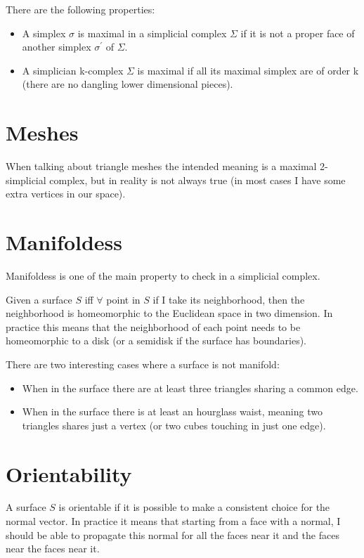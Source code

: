 There are the following properties:
\begin{itemize}
    \item A simplex $\sigma$ is maximal in a simplicial complex $\Sigma$ if it is not a proper face of another simplex $\sigma^{'}$ of $\Sigma$.
    \item A simplician k-complex $\Sigma$ is maximal if all its maximal simplex are of order k (there are no dangling lower dimensional pieces).
\end{itemize}

\section{Meshes}
When talking about triangle meshes the intended meaning is a maximal 2-simplicial complex, but in reality is not always true (in most cases I have some extra vertices in our space).

\section{Manifoldess}
Manifoldess is one of the main property to check in a simplicial complex.\par
Given a surface $S$ iff $\forall$ point in $S$ if I take its neighborhood, then the neighborhood is homeomorphic to the Euclidean space in two dimension. In practice this means that the neighborhood of each point needs to be homeomorphic to a disk (or a semidisk if the surface has boundaries).\par

There are two interesting cases where a surface is not manifold:
\begin{itemize}
    \item When in the surface there are at least three triangles sharing a common edge.
    \item When in the surface there is at least an hourglass waist, meaning two triangles shares just a vertex (or two cubes touching in just one edge).
\end{itemize}

\section{Orientability}
A surface $S$ is orientable if it is possible to make a consistent choice for the normal vector. In practice it means that starting from a face with a normal, I should be able to propagate this normal for all the faces near it and the faces near the faces near it.

